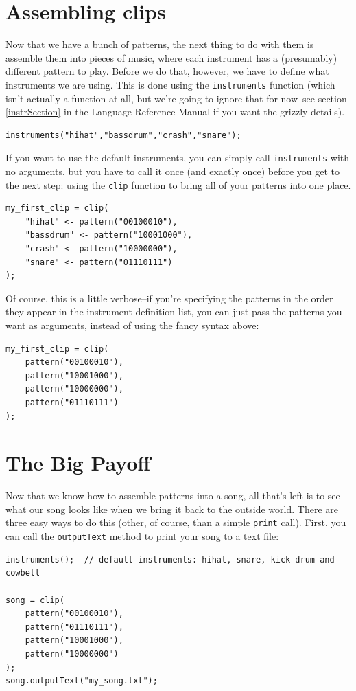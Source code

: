 \section{Assembling clips}

Now that we have a bunch of patterns, the next thing to do with them is assemble them into pieces of music, where each instrument has a (presumably) different pattern to play.  Before we do that, however, we have to define what instruments we are using.  This is done using the {\tt instruments} function (which isn't actually a function at all, but we're going to ignore that for now--see section \ref{instrSection} in the Language Reference Manual if you want the grizzly details).
\begin{lstlisting}
instruments("hihat","bassdrum","crash","snare");
\end{lstlisting}
If you want to use the default instruments, you can simply call {\tt instruments} with no arguments, but you have to call it once (and exactly once) before you get to the next step: using the {\tt clip} function to bring all of your patterns into one place.
\begin{lstlisting}
my_first_clip = clip(
	"hihat" <- pattern("00100010"),
	"bassdrum" <- pattern("10001000"),
	"crash" <- pattern("10000000"),
	"snare" <- pattern("01110111")
);
\end{lstlisting}
Of course, this is a little verbose--if you're specifying the patterns in the order they appear in the instrument definition list, you can just pass the patterns you want as arguments, instead of using the fancy syntax above:
\begin{lstlisting}
my_first_clip = clip(
	pattern("00100010"),
	pattern("10001000"),
	pattern("10000000"),
	pattern("01110111")
);
\end{lstlisting}

\section{The Big Payoff}
Now that we know how to assemble patterns into a song, all that's left is to see what our song looks like
when we bring it back to the outside world.  There are three easy ways to do this (other, of course, than a simple {\tt print} call).  First, you can call the {\tt outputText} method to print your song to a text file:
\begin{lstlisting}
instruments();  // default instruments: hihat, snare, kick-drum and cowbell

song = clip(
	pattern("00100010"),
	pattern("01110111"),
	pattern("10001000"),
	pattern("10000000")
);
song.outputText("my_song.txt");
\end{lstlisting}

